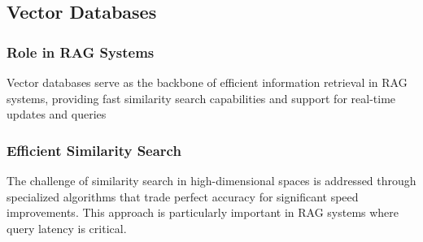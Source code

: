 \documentclass[12pt]{article}
\begin{document}
    \newpage
    \subsection{Vector Databases}
    \subsubsection{Role in RAG Systems}
    Vector databases serve as the backbone of efficient information retrieval in RAG systems, providing 
    fast similarity search capabilities and support for real-time updates and queries

    \subsubsection{Efficient Similarity Search}
    The challenge of similarity search in high-dimensional spaces is addressed through specialized algorithms 
    that trade perfect accuracy for significant speed improvements. This approach is particularly important 
    in RAG systems where query latency is critical.




\end{document}
